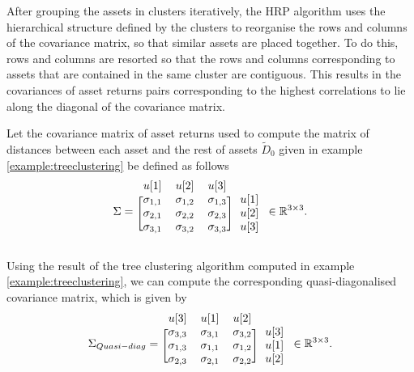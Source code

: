         After grouping the assets in clusters iteratively, the HRP algorithm uses the hierarchical structure defined by the clusters to reorganise the rows and columns of the covariance matrix, so that similar assets are placed together. To do this, rows and columns are resorted so that the rows and columns corresponding to assets that are contained in the same cluster are contiguous. This results in the covariances of asset returns pairs corresponding to the highest correlations to lie along the diagonal of the covariance matrix.
        
        \begin{example}
            Let the covariance matrix of asset returns used to compute the matrix of distances between each asset and the rest of assets $\tilde{D}_0$ given in example \ref{example:treeclustering} be defined as follows
            \begin{align*}
                \Sigma = \begin{blockarray}{cccc}
                                    u[1] & u[2] & u[3] \\
                                        \begin{block}{[ccc]c}
                                          \sigma_{1,1} & \sigma_{1,2} & \sigma_{1,3} & u[1] \\
                                          \sigma_{2,1} & \sigma_{2,2} & \sigma_{2,3} & u[2] \\
                                          \sigma_{3,1} & \sigma_{3,2} & \sigma_{3,3} & u[3] \\
                                        \end{block}
                                \end{blockarray} \in \mathbb{R}^{3 \times 3}.
            \end{align*}
            
            Using the result of the tree clustering algorithm computed in example \ref{example:treeclustering}, we can compute the corresponding quasi-diagonalised covariance matrix, which is given by
            \begin{align*}
                \Sigma_{Quasi-diag} = \begin{blockarray}{cccc}
                                    u[3] & u[1] & u[2] \\
                                        \begin{block}{[ccc]c}
                                          \sigma_{3,3} & \sigma_{3,1} & \sigma_{3,2} & u[3] \\
                                          \sigma_{1,3} & \sigma_{1,1} & \sigma_{1,2} & u[1] \\
                                          \sigma_{2,3} & \sigma_{2,1} & \sigma_{2,2} & u[2] \\
                                        \end{block}
                                \end{blockarray} \in \mathbb{R}^{3 \times 3}.
            \end{align*}
        \end{example}
        
